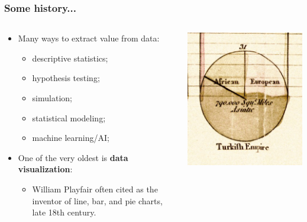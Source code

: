 \documentclass[aspectratio=169]{beamer}
\theoremstyle{principle}
\begin{document}
\begin{frame}
\frametitle{Some history...}

\begin{columns}
\begin{column}{0.5\textwidth}

\begin{itemize}
\item Many ways to extract value from data:
\begin{itemize}
\item descriptive statistics;
\item hypothesis testing;
\item simulation;
\item statistical modeling;
\item machine learning/AI;
\end{itemize}
\bigskip
\bigskip
\item One of the very oldest is \textbf{data visualization}:
\begin{itemize}
\item William Playfair often cited as the inventor of line, bar, and pie charts, late 18th century.
\end{itemize}
\end{itemize}

\end{column}
\begin{column}{0.5\textwidth}
\includegraphics[scale=2.6]{Playfair-piechart.jpg}
\end{column}
\end{columns}

\end{frame}
\end{document}
